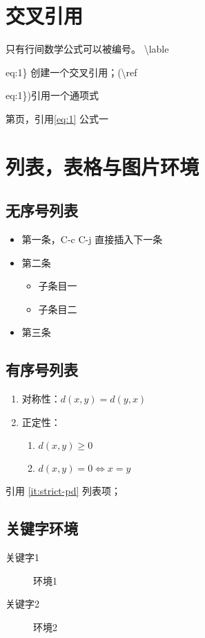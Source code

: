 \documentclass[UTF8]{ctexart}
\begin{document}
\section{交叉引用}
只有行间数学公式可以被编号。
\textbackslash lable{eq:1\} 创建一个交叉引用；(\textbackslash ref{eq:1\})引用一个通项式

第\pageref{eq:1}页，引用\ref{eq:1} 公式一

\section{列表，表格与图片环境}
\subsection{无序号列表}
\begin{itemize}
\item 第一条，C-c C-j 直接插入下一条
\item 第二条
  \begin{itemize}
  \item 子条目一
  \item 子条目二
  \end{itemize}
\item 第三条
\end{itemize}

\subsection{有序号列表}
\begin{enumerate}
\item 对称性：$d(x, y) = d(y, x)$
\item 正定性：
  \begin{enumerate}
  \item $d(x,y) \ge 0$
  \item \label{it:strict-pd} $d(x,y) = 0 \Leftrightarrow x = y$
  \end{enumerate}
\end{enumerate}

引用 \ref{it:strict-pd} 列表项；

\subsection{关键字环境}
\begin{description}
\item[关键字1] 环境1
\item[关键字2] 环境2
\end{description}

}}
\end{document}
